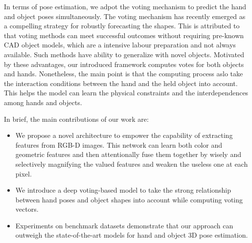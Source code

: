 In terms of pose estimation, we adpot the voting mechanism to predict the hand and object poses simultaneously. The voting mechanism \cite{ding2019votenet, wu2021vote, hoang2022voting} has recently emerged as a compelling strategy for robustly forecasting the shapes. This is attributed to that voting methods can meet successful outcomes without requiring pre-known CAD object models, which are a intensive labour preparation and not always available. Such methods have ability to generalize with novel objects. Motivated by these advantages, our introduced framework computes votes for both objects and hands. Nonetheless, the main point is that the computing process aslo take the interaction conditions between the hand and the held object into account. This helps the model can learn the physical constraints and the interdependences among hands and objects. 

In brief, the main contributions of our work are:

\begin{itemize}
	\item We propose a novel architecture to empower the capability of extracting features from RGB-D images. This network can learn both color and geometric features and then attentionally fuse them together by wisely and selectively magnifying the valued features and weaken the useless one at each pixel. 
	\item We introduce a deep voting-based model to take the strong relationship between hand poses and object shapes into account while computing voting vectors. 
	\item Experiments on benchmark datasets demonstrate that our approach can outweigh the state-of-the-art models for hand and object 3D pose estimation.
\end{itemize}

